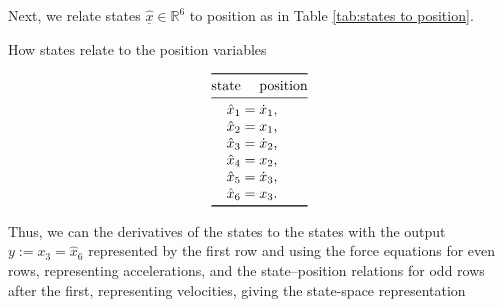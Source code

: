 \documentclass[12pt]{article}
\begin{document}
Next, we relate states $\underline{\hat{x}} \in \mathbb{R}^6$ to position as in Table \ref{tab:states to position}.

\begin{table}[h]
    \centering
    \caption{How states relate to the position variables}
    \[
        \begin{array}{@{}r@{}c@{}l@{}}
        \toprule
            \text{state} & & \text{position}
        \\*
        \midrule
            {\hat{x}}_1 &{}={}& \dot{x}_1\rlap,
        \\*
            {\hat{x}}_2 &{}={}& x_1\rlap,
        \\*
            {\hat{x}}_3 &{}={}& \dot{x}_2\rlap,
        \\*
            {\hat{x}}_4 &{}={}& x_2\rlap,
        \\*
            {\hat{x}}_5 &{}={}& \dot{x}_3\rlap,
        \\*
            {\hat{x}}_6 &{}={}& x_3\rlap.
        \\*
        \bottomrule
        \end{array}
    \]
    \label{tab:states to position}
\end{table}

Thus, we can the derivatives of the states to the states with
the output $y := x_3 = {\hat{x}}_6$ represented by the first row
and using
the force equations for even rows, representing accelerations,
and the state--position relations for odd rows after the first, representing velocities,
giving the state-space representation
\end{document}
